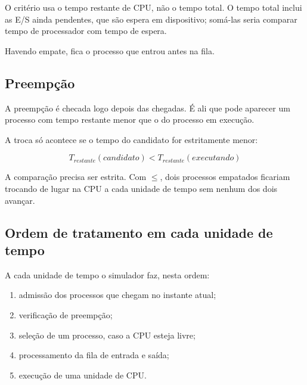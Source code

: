 \documentclass[12pt,a4paper]{article}
\begin{document}
O critério usa o tempo restante de CPU, não o tempo total. O tempo
total inclui as E/S ainda pendentes, que são espera em dispositivo;
somá-las seria comparar tempo de processador com tempo de espera.

Havendo empate, fica o processo que entrou antes na fila.



\subsection{Preempção}

A preempção é checada logo depois das chegadas. É ali que pode
aparecer um processo com tempo restante menor que o do processo em
execução.

A troca só acontece se o tempo do candidato for estritamente menor:

\[
T_{restante}(candidato)
<
T_{restante}(executando)
\]

A comparação precisa ser estrita. Com $\leq$, dois processos empatados
ficariam trocando de lugar na CPU a cada unidade de tempo sem nenhum
dos dois avançar.



\subsection{Ordem de tratamento em cada unidade de tempo}

A cada unidade de tempo o simulador faz, nesta ordem:

\begin{enumerate}

    \item admissão dos processos que chegam no instante atual;

    \item verificação de preempção;

    \item seleção de um processo, caso a CPU esteja livre;

    \item processamento da fila de entrada e saída;

    \item execução de uma unidade de CPU.

\end{enumerate}
\end{document}
